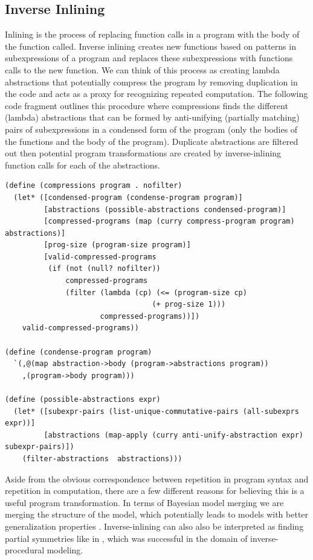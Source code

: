 \documentclass[a4paper,10pt]{article}
\begin{document}
\subsection{Inverse Inlining}
Inlining is the process of replacing function calls in a program with the body of the function called.  Inverse inlining creates new functions based on patterns in subexpressions of a program and replaces these subexpressions with functions calls to the new function.  We can think of this process as creating lambda abstractions that potentially compress the program by removing duplication in the code and acts as a proxy for recognizing repeated computation.  The following code fragment outlines this procedure where compressions finds the different (lambda) abstractions that can be formed by anti-unifying (partially matching) pairs of subexpressions in a condensed form of the program (only the bodies of the functions and the body of the program).  Duplicate abstractions are filtered out then potential program transformations are created by inverse-inlining function calls for each of the abstractions.  

\begin{lstlisting}[frame=trBL]
(define (compressions program . nofilter)
  (let* ([condensed-program (condense-program program)]
         [abstractions (possible-abstractions condensed-program)]
         [compressed-programs (map (curry compress-program program) abstractions)]
         [prog-size (program-size program)]
         [valid-compressed-programs
          (if (not (null? nofilter))
              compressed-programs
              (filter (lambda (cp) (<= (program-size cp)
                                  (+ prog-size 1)))
                      compressed-programs))])
    valid-compressed-programs))

(define (condense-program program)
  `(,@(map abstraction->body (program->abstractions program))
    ,(program->body program)))

(define (possible-abstractions expr)
  (let* ([subexpr-pairs (list-unique-commutative-pairs (all-subexprs expr))]
         [abstractions (map-apply (curry anti-unify-abstraction expr) subexpr-pairs)])
    (filter-abstractions  abstractions)))
\end{lstlisting}

Aside from the obvious correspondence between repetition in program syntax and repetition in computation, there are a few different reasons for believing this is a useful program transformation.  In terms of Bayesian model merging we are merging the structure of the model, which potentially leads to models with better generalization properties \cite{Stolcke:1994:IPG:645515.658235}.  Inverse-inlining can also also be interpreted as finding partial symmetries like in \cite{DBLP:journals/tog/BokelohWS10}, which was successful in the domain of inverse-procedural modeling.
\end{document}
